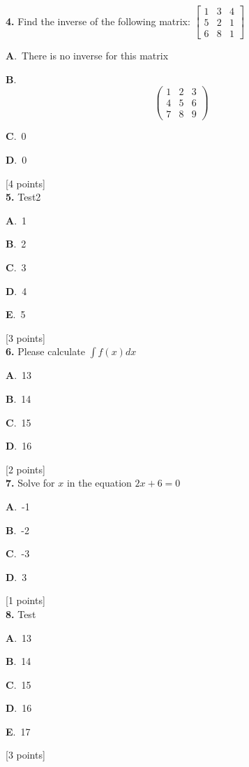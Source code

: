 \documentclass[12pt]{article}
\newcommand{\choice}[3]{%
  \noindent\textbf{#1}.~#2\hfill#3\par\vspace{0.25em}
}
\begin{document}
\noindent \textbf{\textenglish{4.}} {\textenglish{Find the inverse of the following matrix: }}\(\begin{bmatrix} 1 & 3 & 4 \\ 5 & 2 & 1 \\ 6 & 8 & 1 \end{bmatrix}\)

\noindent\choice{A}{{\textenglish{There is no inverse for this matrix}}}{}
\noindent\choice{B}{\[\begin{pmatrix} 1 & 2 & 3 \\ 4 & 5 & 6 \\ 7 & 8 & 9  \end{pmatrix}\]}{}
\noindent\choice{C}{{\textenglish{0}}}{}
\noindent\choice{D}{{\textenglish{0}}}{}
\hfill {\textenglish{[4 points]}}\\[0.5em]

\noindent \textbf{\textenglish{5.}} {\textenglish{Test2}}

\noindent\choice{A}{{\textenglish{1}}}{}
\noindent\choice{B}{{\textenglish{2}}}{}
\noindent\choice{C}{{\textenglish{3}}}{}
\noindent\choice{D}{{\textenglish{4}}}{}
\noindent\choice{E}{{\textenglish{5}}}{}
\hfill {\textenglish{[3 points]}}\\[0.5em]

\noindent \textbf{\textenglish{6.}} {\textenglish{Please calculate }}\(\int f(x)dx\)

\noindent\choice{A}{{\textenglish{13}}}{}
\noindent\choice{B}{{\textenglish{14}}}{}
\noindent\choice{C}{{\textenglish{15}}}{}
\noindent\choice{D}{{\textenglish{16}}}{}
\hfill {\textenglish{[2 points]}}\\[0.5em]

\noindent \textbf{\textenglish{7.}} {\textenglish{Solve for }}\(x \){\textenglish{ in the equation }}\(2x+6 = 0 \)

\noindent\choice{A}{{\textenglish{-1}}}{}
\noindent\choice{B}{{\textenglish{-2}}}{}
\noindent\choice{C}{{\textenglish{-3}}}{}
\noindent\choice{D}{{\textenglish{3}}}{}
\hfill {\textenglish{[1 points]}}\\[0.5em]

\noindent \textbf{\textenglish{8.}} {\textenglish{Test}}

\noindent\choice{A}{{\textenglish{13}}}{}
\noindent\choice{B}{{\textenglish{14}}}{}
\noindent\choice{C}{{\textenglish{15}}}{}
\noindent\choice{D}{{\textenglish{16}}}{}
\noindent\choice{E}{{\textenglish{17}}}{}
\hfill {\textenglish{[3 points]}}\\[0.5em]
\end{document}

